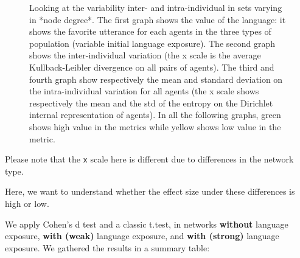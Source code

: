 \documentclass[
]{article}
\begin{document}
\begin{figure}[!H]
\caption{Looking at the variability inter- and intra-individual in sets varying in *node degree*. The first graph shows the value of the language: it shows the favorite utterance for each agents in the three types of population (variable initial language exposure). The second graph shows the  inter-individual variation (the x scale is the average Kullback-Leibler divergence on all pairs of agents). The third and fourth graph show respectively the mean and standard deviation on the intra-individual variation for all agents (the x scale shows respectively the mean and the std of the entropy on the Dirichlet internal representation of agents). In all the following graphs, green shows high value in the metrics while yellow shows low value in the metric.}\label{fig:unnamed-chunk-28}
\end{figure}

Please note that the \texttt{x} scale here is different due to
differences in the network type.

Here, we want to understand whether the effect size under these
differences is high or low.

We apply Cohen's d test and a classic t.test, in networks
\textbf{without} language exposure, \textbf{with (weak)} language
exposure, and \textbf{with (strong)} language exposure. We gathered the
results in a summary table:
\end{document}
